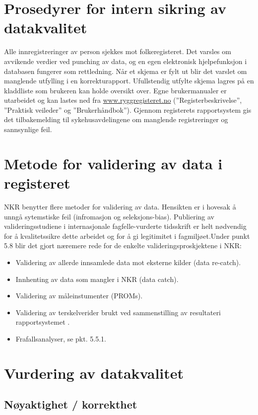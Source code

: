 \documentclass[norsk, a4paper, twocolumn]{report}
\begin{document}
\section{Prosedyrer for intern sikring av datakvalitet}\label{sec:sik}
Alle innregistreringer av person sjekkes mot folkeregisteret. Det varsles om avvikende verdier ved punching av data, og en egen elektronisk hjelpefunksjon i databasen fungerer som rettledning. Når et skjema er fylt ut blir det varslet om manglende utfylling i en korrekturapport. Ufullstendig utfylte skjema lagres på en kladdliste som brukeren kan holde oversikt over. Egne brukermanualer er utarbeidet og kan lastes ned fra  \url{www.ryggregisteret.no}  (”Registerbeskrivelse”, ”Praktisk veileder” og ”Brukerhåndbok”). Gjennom registerets rapportsystem gis det tilbakemelding til sykehusavdelingene om manglende registreringer og sannsynlige feil. 

\section{Metode for validering av data i registeret}\label{sec:metval}
NKR benytter flere metoder for validering av data. Hensikten er i hovesak å unngå sytemstiske feil (infromasjon og seleksjons-bias). Publiering av valideringsstudiene i internasjonale fagfelle-vurderte tidsskrift er helt nødvendig for å kvalitetssikre dette arbeidet og for å gi legitimitet i fagmiljøet.Under punkt 5.8 blir det gjort næremere rede for de enkelte valideringsproskjektene i NKR:
\begin{itemize} \item {Validering av allerde innsamlede data mot eksterne kilder (data re-catch).}
\item Innhenting av data som mangler i NKR (data catch).
\item Validering av måleinstumenter (PROMs).
\item Validering av terskelverider brukt  ved sammenstilling av resultateri rapportsystemet .
\item Frafallsanalyser, se pkt. 5.5.1.

\end{itemize}

\section{Vurdering av datakvalitet}\label{sec:valdat}


\subsection{Nøyaktighet / korrekthet}
\end{document}
